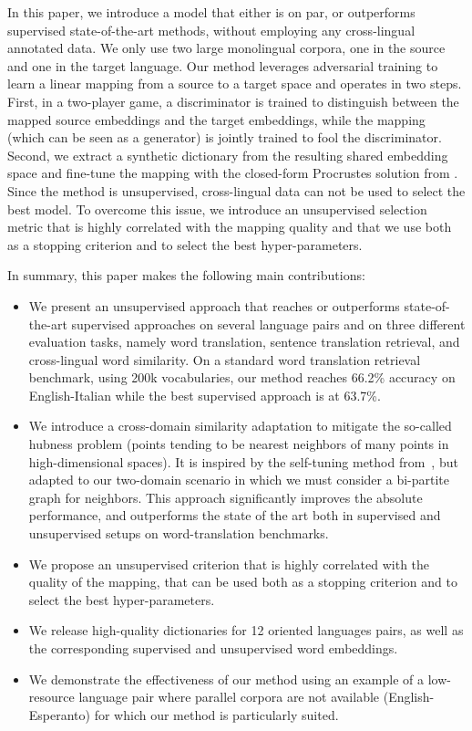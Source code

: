 \documentclass{article} \usepackage{iclr2018_conference,times}
\begin{document}
In this paper, we introduce a model that either is on par, or outperforms supervised state-of-the-art methods, without employing any cross-lingual annotated data. We only use two large monolingual corpora, one in the source and one in the target language. Our method leverages adversarial training to learn a linear mapping from a source to a target space and operates in two steps. First, in a two-player game, a discriminator is trained to distinguish between the mapped source embeddings and the target embeddings, while the mapping (which can be seen as a generator) is jointly trained to fool the discriminator. Second, we extract a synthetic dictionary from the resulting shared embedding space and fine-tune the mapping with the closed-form Procrustes solution from \cite{schonemann1966generalized}. Since the method is unsupervised, cross-lingual data can not be used to select the best model. To overcome this issue, we introduce an unsupervised selection metric that is highly correlated with the mapping quality and that we use both as a stopping criterion and to select the best 
hyper-parameters.

In summary, this paper makes the following main contributions:
\begin{itemize}
  \item We present an unsupervised approach that reaches or outperforms state-of-the-art supervised approaches on several language pairs and on three different evaluation tasks, namely word translation, sentence translation retrieval, and cross-lingual word similarity. On a standard word translation retrieval benchmark, using 200k vocabularies, our method reaches 66.2\% accuracy on English-Italian while the best supervised approach is at 63.7\%.
  \item We introduce a cross-domain similarity adaptation to mitigate the so-called hubness problem (points tending to be nearest neighbors of many points in high-dimensional spaces). It is inspired by the self-tuning method from~\cite{zelnik2005selftuning}, but adapted to our two-domain scenario in which we must consider a bi-partite graph for neighbors. This approach significantly improves the absolute performance, and outperforms the state of the art both in supervised and unsupervised setups on word-translation benchmarks.
  \item We propose an unsupervised criterion that is highly correlated with the quality of the mapping, that can be used both as a stopping criterion and to select the best hyper-parameters.
  \item We release high-quality dictionaries for 12 oriented languages pairs, as well as the corresponding supervised and unsupervised word embeddings.
  \item We demonstrate the effectiveness of our method using an example of a low-resource language pair where parallel corpora are not available  (English-Esperanto) for which our method is particularly suited.
\end{itemize}
\end{document}
